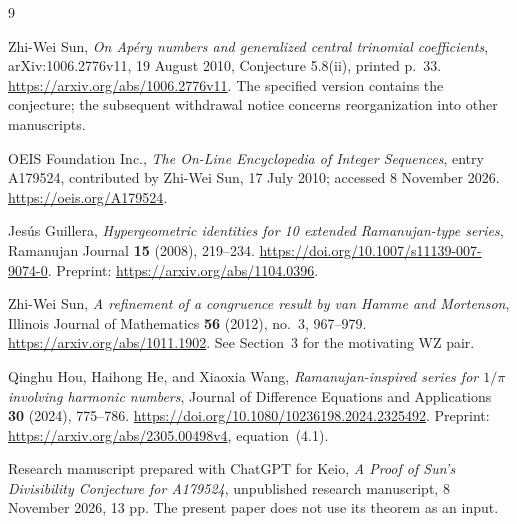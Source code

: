 \documentclass[11pt,a4paper]{article}
\theoremstyle{remark}\newtheorem{remark}[theorem]{Remark}
\begin{document}
\begin{thebibliography}{9}\raggedright

Zhi-Wei Sun,
\emph{On Ap\'ery numbers and generalized central trinomial coefficients},
arXiv:1006.2776v11, 19 August 2010, Conjecture 5.8(ii), printed p.~33.
\url{https://arxiv.org/abs/1006.2776v11}.
The specified version contains the conjecture; the subsequent
withdrawal notice concerns reorganization into other manuscripts.

OEIS Foundation Inc.,
\emph{The On-Line Encyclopedia of Integer Sequences}, entry A179524,
contributed by Zhi-Wei Sun, 17 July 2010; accessed 8 November 2026.
\url{https://oeis.org/A179524}.

Jes\'us Guillera,
\emph{Hypergeometric identities for 10 extended Ramanujan-type series},
Ramanujan Journal \textbf{15} (2008), 219--234.
\url{https://doi.org/10.1007/s11139-007-9074-0}.
Preprint: \url{https://arxiv.org/abs/1104.0396}.

Zhi-Wei Sun,
\emph{A refinement of a congruence result by van Hamme and Mortenson},
Illinois Journal of Mathematics \textbf{56} (2012), no.~3, 967--979.
\url{https://arxiv.org/abs/1011.1902}.
See Section~3 for the motivating WZ pair.

Qinghu Hou, Haihong He, and Xiaoxia Wang,
\emph{Ramanujan-inspired series for \(1/\pi\) involving harmonic numbers},
Journal of Difference Equations and Applications \textbf{30} (2024),
775--786.
\url{https://doi.org/10.1080/10236198.2024.2325492}.
Preprint: \url{https://arxiv.org/abs/2305.00498v4}, equation~(4.1).

Research manuscript prepared with ChatGPT for Keio,
\emph{A Proof of Sun's Divisibility Conjecture for A179524},
unpublished research manuscript, 8 November 2026, 13 pp.
The present paper does not use its theorem as an input.

\end{thebibliography}
\end{document}
